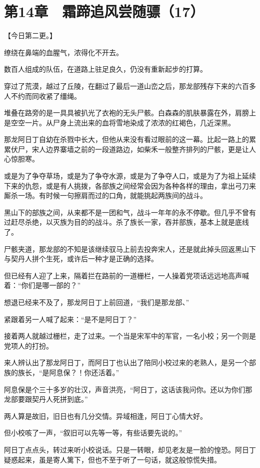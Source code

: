 \section{第14章　霜蹄追风尝随骠（17）}

【今日第二更。】

缭绕在鼻端的血腥气，浓得化不开去。

数百人组成的队伍，在道路上驻足良久，仍没有重新起步的打算。

穿过了荒漠，越过了丘陵，在翻过了最后一道山峦之后，那龙部残存下来的六百多人不约而同收紧了缰绳。

堆叠在路旁的是一具具被扒光了衣袍的无头尸骸。白森森的肌肤暴露在外，肩膀上是空空一片。从尸身上流出来的血将雪地染成了浓浓的红褐色，几近深黑。

那龙阿日丁自幼在杀戮中长大，但他从来没有看过眼前的这一幕。比起一路上的累累伏尸，宋人边界寨墙之前的一段道路边，如柴禾一般整齐排列的尸骸，更是让人心惊胆寒。

或是为了争夺草场，或是为了争夺水源，或是为了争夺人口，或是为了为祖上延续下来的仇怨，或是有人挑拨，各部族之间经常会因为各种各样的理由，拿出弓刀来厮杀一场。有时候一句擦肩而过的口角，就能挑起两族间的战斗。

黑山下的部族之间，从来都不是一团和气，战斗一年年的永不停歇。但几乎不曾有过赶尽杀绝，以灭族为目的的战斗。杀了族长一家，吞并部族，基本上就是底线了。

尸骸夹道，那龙部的不知是该继续驭马上前去投奔宋人，还是就此掉头回返黑山下与契丹人拼个生死，或许后一种才是正确的选择。

但已经有人迎了上来，隔着拦在路前的一道栅栏，一人操着党项话远远地高声喊着：“你们是哪一部的？”

想退已经来不及了，那龙阿日丁上前回道，“我们是那龙部、”

紧跟着另一人喊了起来：“是不是阿日丁？”

接着两人就越过栅栏，走了过来。一个当是宋军中的军官，一名小校；另一个则是党项人的打扮。

来人辨认出了那龙阿日丁，而阿日丁也认出了陪同小校过来的老熟人，是另一个部族的族长，“是阿息保？！你还活着。”

阿息保是个三十多岁的壮汉，声音洪亮，“阿日丁，这话该我问你。还以为你们那龙部要跟契丹人死拼到底。”

两人算是故旧，旧日也有几分交情。异域相逢，阿日丁心情大好。

但小校咳了一声，“叙旧可以先等一等，有些话要先说的。”

阿日丁点点头，转过来听小校说话。只是一转眼，却见老友是一脸的惶恐。阿日丁疑惑起来，虽是寄人篱下，但也不至于听了一句话，就这般惊慌失措。

